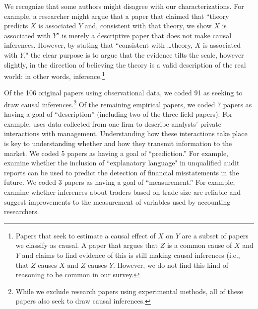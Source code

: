 \documentclass[12pt,reqno,titlepage]{amsart}
\begin{document}
\begin{doublespace}
We recognize that some authors might disagree with our characterizations.
For example, a researcher might argue that a paper that claimed that ``theory predicts $X$ is associated $Y$ and, consistent with that theory, we show $X$ is associated with $Y$" is merely a descriptive paper that does not make causal inferences.
However, by stating that ``consistent with \dots theory, $X$ is associated with $Y$," the clear purpose is to argue that the evidence tilts the scale, however slightly, in the direction of believing the theory is a valid description of the real world: in other words, inference.\footnote{
Papers that seek to estimate a causal effect of $X$ on $Y$ are a subset of papers we classify as causal.
A paper that argues that $Z$ is a common cause of $X$ and $Y$ and claims to find evidence of this is still making causal inferences (i.e., that $Z$ causes $X$ and $Z$ causes $Y$.
However, we do not find this kind of reasoning to be common in our survey.}

Of the 106 original papers using observational data, we coded 91 as seeking to draw causal inferences.\footnote{While we exclude research papers using experimental methods, all of these papers also seek to draw causal inferences.}
Of the remaining empirical papers, we coded 7 papers as having a goal of ``description'' (including two of the three field papers). 
For example, \citet{Soltes:2013ba} uses data collected from one firm to describe analysts' private interactions with management. Understanding how these interactions take place is key to understanding whether and how they transmit information to the market.
We coded 5 papers as having a goal of ``prediction.'' 
For example, \citet{Czerney:2014bv} examine whether the inclusion of ``explanatory language" in unqualified audit reports can be used to predict the detection of financial misstatements in the future.
We coded 3 papers as having a goal of ``measurement.'' 
For example, \citet{Cready:2014ji} examine whether inferences about traders based on trade size are reliable and suggest improvements to the measurement of variables used by accounting researchers.


\end{doublespace}
\end{document}
